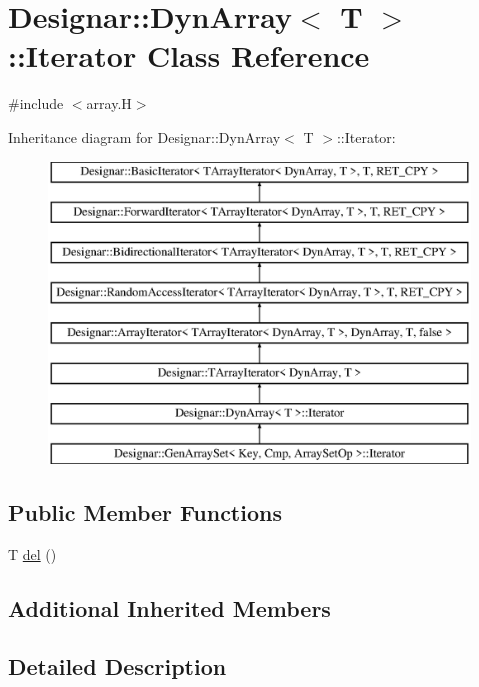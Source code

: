 \hypertarget{class_designar_1_1_dyn_array_1_1_iterator}{}\section{Designar\+:\+:Dyn\+Array$<$ T $>$\+:\+:Iterator Class Reference}
\label{class_designar_1_1_dyn_array_1_1_iterator}


{\ttfamily \#include $<$array.\+H$>$}

Inheritance diagram for Designar\+:\+:Dyn\+Array$<$ T $>$\+:\+:Iterator\+:\begin{figure}[H]
\begin{center}
\leavevmode
\includegraphics[height=8.000000cm]{class_designar_1_1_dyn_array_1_1_iterator}
\end{center}
\end{figure}
\subsection*{Public Member Functions}
\begin{DoxyCompactItemize}
\item 
T \hyperlink{class_designar_1_1_dyn_array_1_1_iterator_a3d700006f23d3c4b63e109edef32410f}{del} ()
\end{DoxyCompactItemize}
\subsection*{Additional Inherited Members}


\subsection{Detailed Description}
